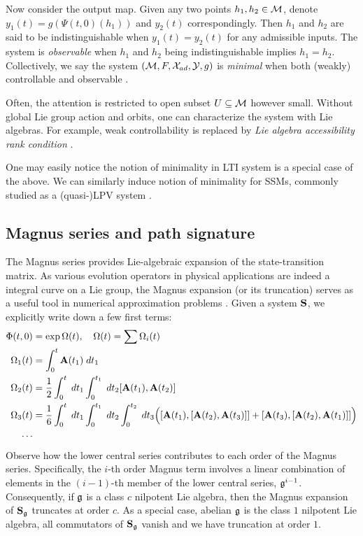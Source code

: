 Now consider the output map.
Given any two points $h_1, h_2 \in \mathcal{M}$, denote $y_1(t) = g(\Psi(t,0)(h_1))$ and $y_2(t)$ correspondingly.
Then $h_1$ and $h_2$ are said to be indistinguishable when $y_1(t) = y_2(t)$ for any admissible inputs.
The system is \emph{observable} when $h_1$ and $h_2$ being indistinguishable implies $h_1 = h_2$.
Collectively, we say the system $(\mathcal{M},F,\mathcal{X}_{ad},\mathcal{Y},g)$ is \emph{minimal}
when both (weakly) controllable and observable \cite{krener1977decomposition}.
\begin{remark}
    Often, the attention is restricted to open subset $U \subseteq \mathcal{M}$ however small.
    Without global Lie group action and orbits, one can characterize the system with Lie algebras.
    For example, weak controllability is replaced by \emph{Lie algebra accessibility rank condition} \cite{sontag2013mathematical}.
\end{remark}
One may easily notice the notion of minimality in LTI system is a special case of the above.
We can similarly induce notion of minimality for SSMs,
commonly studied as a (quasi-)LPV system \cite{toth2010modeling}.
\subsection{Magnus series and path signature}
\label{app:CDE}
The Magnus series provides Lie-algebraic expansion of the state-transition matrix.
As various evolution operators in physical applications are indeed a integral curve on a Lie group,
the Magnus expansion (or its truncation) serves as a useful tool in numerical approximation problems \cite{iserles2000lie}.
Given a system $\mathbf{S}$, we explicitly write down a few first terms:
\begin{align*}
    \Phi(t,0) &= \exp \Omega(t),
    \quad
    \Omega(t) = \sum \Omega_i(t)\\
    \Omega_1(t) &= \int_0^t \mathbf{A}(t_1) \; dt_1 \\
    \Omega_2(t) &= \frac{1}{2}\int_0^t \; dt_1 \int_0^{t_1} \; dt_2
    [\mathbf{A}(t_1), \mathbf{A}(t_2)] \\
    \Omega_3(t) &= \frac{1}{6}\int_0^t \; dt_1 \int_0^{t_1} \; dt_2 \int_0^{t_2} \; dt_3
    \Bigl(
    [\mathbf{A}(t_1), [\mathbf{A}(t_2), \mathbf{A}(t_3)]] + [\mathbf{A}(t_3), [\mathbf{A}(t_2), \mathbf{A}(t_1)]]
    \Bigr)
    \\
    \cdots
\end{align*}
Observe how the lower central series contributes to each order of the Magnus series.
Specifically, the $i$-th order Magnus term involves a linear combination of elements in the $(i-1)$-th member of the lower central series, $\mathfrak{g}^{i-1}$.
Consequently, if $\mathfrak{g}$ is a class $c$ nilpotent Lie algebra, then the Magnus expansion of $\mathbf{S}_{\mathfrak{g}}$ truncates at order $c$. As a special case, abelian $\mathfrak{g}$ is the class $1$ nilpotent Lie algebra, all commutators of $\mathbf{S}_{\mathfrak{g}}$ vanish and we have truncation at order $1$.


